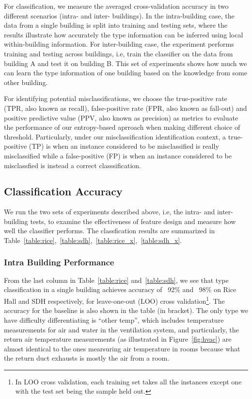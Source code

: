 For classification, we measure the averaged cross-validation accuracy in two different scenarios (intra- and inter- buildings). In the intra-building case, the 
data from a single building is split into training and testing sets, where the results illustrate how accurately the type information can be inferred using local 
within-building information. For inter-building case, the experiment performs training and testing across buildings, i.e, train the classifier on the data from building A 
and test it on building B. This set of experiments shows how much we can learn the type information of one building based on the knowledge from some other building.

For identifying potential misclassifications, we choose the true-positive rate (TPR, also known as recall), false-positive rate (FPR, also known as fall-out) and positive predictive 
value (PPV, also known as precision) as metrics to evaluate the performance of our entropy-based aprroach when making different choice of threshold. Particularly, under our misclassification
identification context, a true-positive (TP) is when an instance considered to be misclassified is really misclassified while a false-positive (FP) is when an instance considered to be misclassfied 
is instead a correct classsification.

\subsection{Classification Accuracy}
We run the two sets of experiments described above, i.e, the intra- and inter- building tests, to examine the effectiveness of feature design and measure how well 
the classifier performs. The classfication results are summarized in Table~\ref{table:rice},~\ref{table:sdh},~\ref{table:rice_x},~\ref{table:sdh_x}.

\subsubsection{Intra Building Performance}
From the last column in Table~\ref{table:rice} and~\ref{table:sdh}, we see that type classification in a single building achieves accuracy of ~92\% and ~98\% on Rice Hall 
and SDH respectively, for leave-one-out (LOO) cross validation\footnote{In LOO cross validation, each training set takes all the instances except one with the test set being 
the sample held out.}. The accuracy for the baseline is also shown in the table (in bracket). The only type we have difficulty differentiating is ``other temp'', which includes 
temperature measurements for air and water in the ventilation system, and particularly, the return air temperature measurements (as illustrated in Figure~\ref{fig:hvac}) are 
almost identical to the ones mearsuring air temperature in rooms because what the return duct exhausts is mostly the air from a room.

